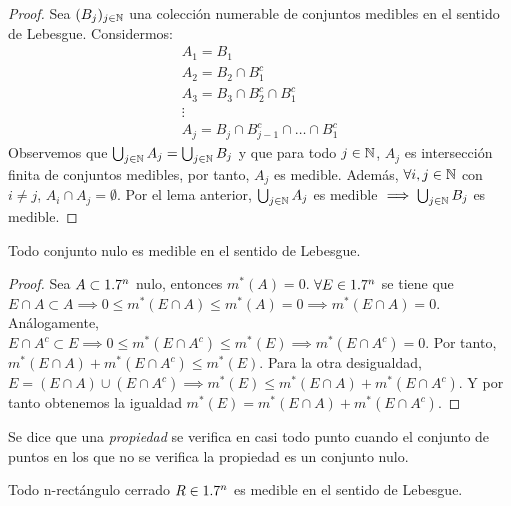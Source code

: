 \begin{proof}
    Sea $(B_j)_{j \in \mathbb{N}}$ una colección numerable de conjuntos medibles en el sentido de Lebesgue. Considermos:
    \[\begin{matrix}
            A_1 = B_1                       \\
            A_2 = B_2 \cap B_1^c            \\
            A_3 = B_3 \cap B_2^c \cap B_1^c \\
            \vdots                          \\
            A_j = B_j \cap B_{j-1}^c \cap \ldots \cap B_1^c
        \end{matrix}\]
    Observemos que $\bigcup_{j \in \mathbb{N}} A_j = \bigcup_{j \in \mathbb{N}} B_j$ y que para
    todo $j \in \mathbb{N}$, $A_j$ es intersección finita de conjuntos medibles, por tanto,
    $A_j$ es medible. Además, $\forall i,j \in \mathbb{N}$ con $i \neq j$, $A_i \cap A_j =
        \emptyset$. Por el lema anterior, $\bigcup_{j \in \mathbb{N}} A_j$ es medible $\implies
        \bigcup_{j \in \mathbb{N}} B_j$ es medible.
\end{proof}

\begin{proposición}
Todo conjunto nulo es medible en el sentido de Lebesgue.
\end{proposición}

\begin{proof}
    Sea $A \subset 1.7^n$ nulo, entonces $m^*(A) = 0$. $\forall E \in 1.7^n$ se tiene que $E \cap A \subset A \implies 0 \leq m^*(E \cap A) \leq m^*(A) = 0 \implies m^*(E \cap A) = 0$. Análogamente, $E \cap A^c \subset E \implies 0 \leq m^*(E \cap A^c) \leq m^*(E) \implies m^*(E \cap A^c) = 0$. Por tanto, $m^*(E \cap A) + m^*(E \cap A^c) \leq m^*(E)$. Para la otra desigualdad, $E = (E \cap A) \cup (E \cap A^c) \implies m^*(E) \leq m^*(E \cap A) + m^*(E \cap A^c)$. Y por tanto obtenemos la igualdad $m^*(E) = m^*(E \cap A) + m^*(E \cap A^c)$.
\end{proof}

\begin{definición}
Se dice que una \textit{propiedad} se verifica en casi todo punto cuando el conjunto de puntos en los que no se verifica la propiedad es un conjunto nulo.
\end{definición}

\begin{proposición}
Todo n-rectángulo cerrado $R \in 1.7^n$ es medible en el sentido de Lebesgue.
\end{proposición}

